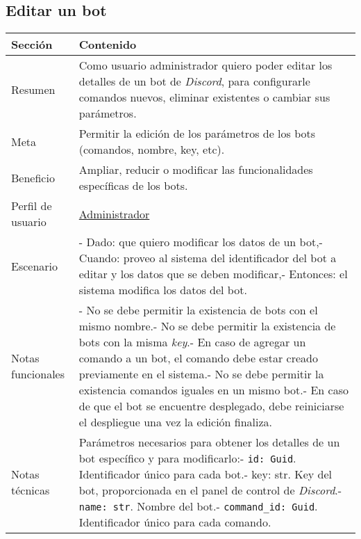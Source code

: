 \subsection{Editar un bot}

\begin{table}[H]
    \centering
    \def\arraystretch{1.25}
    \begin{adjustbox}{max width=\textwidth}
    \begin{tabularx}{\textwidth}{l|L}
    \hline
        \textbf{Sección} & \textbf{Contenido} \\ \hline
    \hline
        Resumen & Como usuario administrador quiero poder editar los detalles de un bot de \textit{Discord}, para configurarle comandos nuevos, eliminar existentes o cambiar sus parámetros. \\ \hline
        Meta & Permitir la edición de los parámetros de los bots (comandos, nombre, key, etc). \\ \hline
        Beneficio & Ampliar, reducir o modificar las funcionalidades específicas de los bots. \\ \hline
        Perfil de usuario & \hyperref[sec:personaAdmin]{Administrador} \\ \hline
        Escenario & - Dado: que quiero modificar los datos de un bot,\linebreak - Cuando: proveo al sistema del identificador del bot a editar y los datos que se deben modificar,\linebreak - Entonces: el sistema modifica los datos del bot. \\ \hline
        Notas funcionales & - No se debe permitir la existencia de bots con el mismo nombre.\linebreak - No se debe permitir la existencia de bots con la misma \textit{key}.\linebreak - En caso de agregar un comando a un bot, el comando debe estar creado previamente en el sistema.\linebreak - No se debe permitir la existencia comandos iguales en un mismo bot.\linebreak - En caso de que el bot se encuentre desplegado, debe reiniciarse el despliegue una vez la edición finaliza. \\ \hline
        Notas técnicas & Parámetros necesarios para obtener los detalles de un bot específico y para modificarlo:\linebreak - \verb|id: Guid|. Identificador único para cada bot.\linebreak - key: str. Key del bot, proporcionada en el panel de control de \textit{Discord}.\linebreak - \verb|name: str|. Nombre del bot.\linebreak - \verb|command_id: Guid|. Identificador único para cada comando. \\ \hline

\end{tabularx}
\end{adjustbox}
\end{table}
